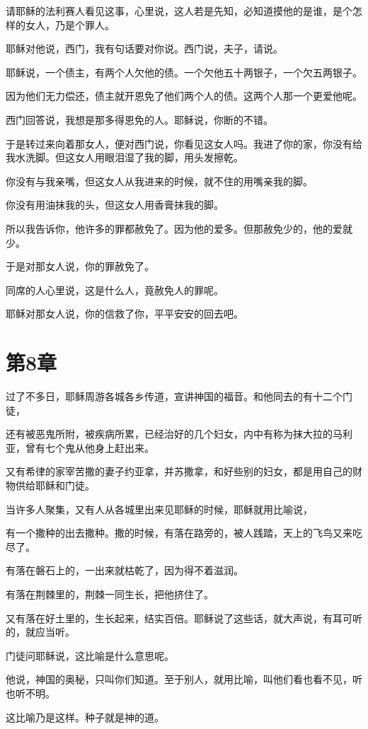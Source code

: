 \documentclass[12pt,oneside]{book}
\begin{document}
请耶稣的法利赛人看见这事，心里说，这人若是先知，必知道摸他的是谁，是个怎样的女人，乃是个罪人。

耶稣对他说，西门，我有句话要对你说。西门说，夫子，请说。

耶稣说，一个债主，有两个人欠他的债。一个欠他五十两银子，一个欠五两银子。

因为他们无力偿还，债主就开恩免了他们两个人的债。这两个人那一个更爱他呢。

西门回答说，我想是那多得恩免的人。耶稣说，你断的不错。

于是转过来向着那女人，便对西门说，你看见这女人吗。我进了你的家，你没有给我水洗脚。但这女人用眼泪湿了我的脚，用头发擦乾。

你没有与我亲嘴，但这女人从我进来的时候，就不住的用嘴亲我的脚。

你没有用油抹我的头，但这女人用香膏抹我的脚。

所以我告诉你，他许多的罪都赦免了。因为他的爱多。但那赦免少的，他的爱就少。

于是对那女人说，你的罪赦免了。

同席的人心里说，这是什么人，竟赦免人的罪呢。

耶稣对那女人说，你的信救了你，平平安安的回去吧。

\chapter{第8章}
过了不多日，耶稣周游各城各乡传道，宣讲神国的福音。和他同去的有十二个门徒，

还有被恶鬼所附，被疾病所累，已经治好的几个妇女，内中有称为抹大拉的马利亚，曾有七个鬼从他身上赶出来。

又有希律的家宰苦撒的妻子约亚拿，并苏撒拿，和好些别的妇女，都是用自己的财物供给耶稣和门徒。

当许多人聚集，又有人从各城里出来见耶稣的时候，耶稣就用比喻说，

有一个撒种的出去撒种。撒的时候，有落在路旁的，被人践踏，天上的飞鸟又来吃尽了。

有落在磐石上的，一出来就枯乾了，因为得不着滋润。

有落在荆棘里的，荆棘一同生长，把他挤住了。

又有落在好土里的，生长起来，结实百倍。耶稣说了这些话，就大声说，有耳可听的，就应当听。

门徒问耶稣说，这比喻是什么意思呢。

他说，神国的奥秘，只叫你们知道。至于别人，就用比喻，叫他们看也看不见，听也听不明。

这比喻乃是这样。种子就是神的道。
\end{document}
